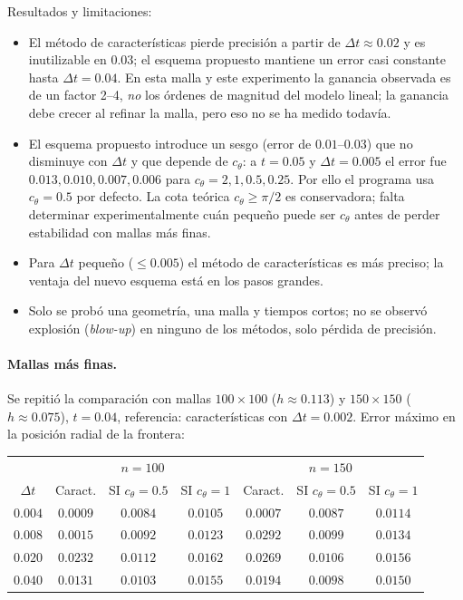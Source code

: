Resultados y limitaciones:
\begin{itemize}
	\item El método de características pierde precisión a partir de $\Delta t\approx0.02$ y es inutilizable en $0.03$; el esquema propuesto mantiene un error casi constante hasta $\Delta t=0.04$. En esta malla y este experimento la ganancia observada es de un factor 2--4, \emph{no} los órdenes de magnitud del modelo lineal; la ganancia debe crecer al refinar la malla, pero eso no se ha medido todavía.
	\item El esquema propuesto introduce un sesgo (error de $0.01$--$0.03$) que no disminuye con $\Delta t$ y que depende de $c_\theta$: a $t=0.05$ y $\Delta t=0.005$ el error fue $0.013, 0.010, 0.007, 0.006$ para $c_\theta=2, 1, 0.5, 0.25$. Por ello el programa usa $c_\theta=0.5$ por defecto. La cota teórica $c_\theta\ge\pi/2$ es conservadora; falta determinar experimentalmente cuán pequeño puede ser $c_\theta$ antes de perder estabilidad con mallas más finas.
	\item Para $\Delta t$ pequeño ($\le 0.005$) el método de características es más preciso; la ventaja del nuevo esquema está en los pasos grandes.
	\item Solo se probó una geometría, una malla y tiempos cortos; no se observó explosión (\emph{blow-up}) en ninguno de los métodos, solo pérdida de precisión.
\end{itemize}

\paragraph{Mallas más finas.} Se repitió la comparación con mallas $100\times100$ ($h\approx0.113$) y $150\times150$ ($h\approx0.075$), $t=0.04$, referencia: características con $\Delta t=0.002$. Error máximo en la posición radial de la frontera:

\begin{center}
\begin{tabular}{c|ccc|ccc}
\toprule
 & \multicolumn{3}{c|}{$n=100$} & \multicolumn{3}{c}{$n=150$}\\
$\Delta t$ & Caract. & SI $c_\theta=0.5$ & SI $c_\theta=1$ & Caract. & SI $c_\theta=0.5$ & SI $c_\theta=1$\\
\midrule
$0.004$ & $0.0009$ & $0.0084$ & $0.0105$ & $0.0007$ & $0.0087$ & $0.0114$\\
$0.008$ & $0.0015$ & $0.0092$ & $0.0123$ & $0.0292$ & $0.0099$ & $0.0134$\\
$0.020$ & $0.0232$ & $0.0112$ & $0.0162$ & $0.0269$ & $0.0106$ & $0.0156$\\
$0.040$ & $0.0131$ & $0.0103$ & $0.0155$ & $0.0194$ & $0.0098$ & $0.0150$\\
\bottomrule
\end{tabular}
\end{center}

